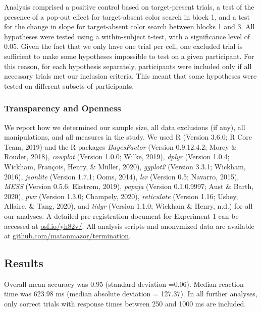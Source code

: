 \documentclass[12pt,twoside]{reedthesis}
\begin{document}
Analysis comprised a positive control based on target-present trials, a test of the presence of a pop-out effect for target-absent color search in block 1, and a test for the change in slope for target-absent color search between blocks 1 and 3. All hypotheses were tested using a within-subject t-test, with a significance level of 0.05.
Given the fact that we only have one trial per cell, one excluded trial is sufficient to make some hypotheses impossible to test on a given participant. For this reason, for each hypothesis separately, participants were included only if all necessary trials met our inclusion criteria. This meant that some hypotheses were tested on different subsets of participants.

\hypertarget{transparency-and-openness}{%
\subsubsection{Transparency and Openness}\label{transparency-and-openness}}

We report how we determined our sample size, all data exclusions (if any), all manipulations, and all measures in the study. We used R (Version 3.6.0; R Core Team, 2019) and the R-packages \emph{BayesFactor} (Version 0.9.12.4.2; Morey \& Rouder, 2018), \emph{cowplot} (Version 1.0.0; Wilke, 2019), \emph{dplyr} (Version 1.0.4; Wickham, François, Henry, \& Müller, 2020), \emph{ggplot2} (Version 3.3.1; Wickham, 2016), \emph{jsonlite} (Version 1.7.1; Ooms, 2014), \emph{lsr} (Version 0.5; Navarro, 2015), \emph{MESS} (Version 0.5.6; Ekstrøm, 2019), \emph{papaja} (Version 0.1.0.9997; Aust \& Barth, 2020), \emph{pwr} (Version 1.3.0; Champely, 2020), \emph{reticulate} (Version 1.16; Ushey, Allaire, \& Tang, 2020), and \emph{tidyr} (Version 1.1.0; Wickham \& Henry, n.d.) for all our analyses. A detailed pre-registration document for Experiment 1 can be accessed at \url{osf.io/yh82v/}. All analysis scripts and anonymized data are available at \url{github.com/matanmazor/termination}.

\hypertarget{results}{%
\subsection{Results}\label{results}}

Overall mean accuracy was 0.95 (standard deviation =0.06). Median reaction time was 623.98 ms (median absolute deviation = 127.37). In all further analyses, only correct trials with response times between 250 and 1000 ms are included.
\end{document}
